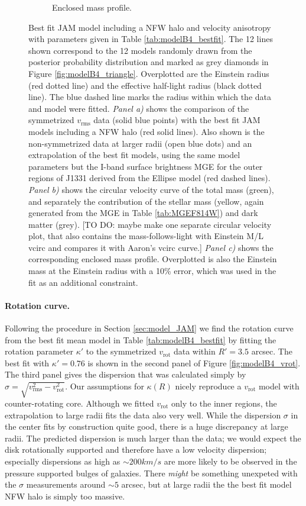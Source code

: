 \begin{figure}
\begin{subfigure}{.48\textwidth}
  \caption{Enclosed mass profile.}
  \label{fig:modelB4_enclMass}
\end{subfigure}
\caption{Best fit JAM model including a NFW halo and velocity anisotropy with parameters given in Table \ref{tab:modelB4_bestfit}. The 12 lines shown correspond to the 12 models randomly drawn from the posterior probability distribution and marked as grey diamonds in Figure \ref{fig:modelB4_triangle}. Overplotted are the Einstein radius (red dotted line) and the effective half-light radius (black dotted line). The blue dashed line marks the radius within which the data and model were fitted. \emph{Panel a)} shows the comparison of the symmetrized $v_\text{rms}$ data (solid blue points) with the best fit JAM models including a NFW halo (red solid lines). Also shown is the non-symmetrized data at larger radii (open blue dots) and an extrapolation of the best fit models, using the same model parameters but the I-band surface brightness MGE for the outer regions of J1331 derived from the Ellipse model (red dashed lines). \emph{Panel b)} shows the circular velocity curve of the total mass (green), and separately the contribution of the stellar mass (yellow, again generated from the MGE in Table \ref{tab:MGEF814W}) and dark matter (grey). [TO DO: maybe make one separate circular velocity plot, that also contains the mass-follows-light with Einstein M/L vcirc and compares it with Aaron's vcirc curve.] \emph{Panel c)} shows the corresponding enclosed mass profile. Overplotted is also the Einstein mass at the Einstein radius with a 10\% error, which was used in the fit as an additional constraint.}
\label{fig:modelB4_models}
\end{figure}



\paragraph{Rotation curve.} Following the procedure in Section \ref{sec:model_JAM} we find the rotation curve from the best fit mean model in Table \ref{tab:modelB4_bestfit} by fitting the rotation parameter $\kappa'$ to the symmetrized $v_\text{rot}$ data within $R' = 3.5$ arcsec. The best fit with $\kappa' = 0.76$ is shown in the second panel of Figure \ref{fig:modelB4_vrot}. The third panel gives the dispersion that was calculated simply by $\sigma = \sqrt{v_\text{rms}^2 - v_\text{rot}^2}$. Our assumptions for $\kappa(R)$ nicely reproduce a $v_\text{rot}$ model with counter-rotating core. Although we fitted $v_\text{rot}$ only to the inner regions, the extrapolation to large radii fits the data also very well. While the dispersion $\sigma$ in the center fits by construction quite good, there is a huge discrepancy at large radii. The predicted dispersion is much larger than the data; we would expect the disk rotationally supported and therefore have a low velocity dispersion; especially dispersions as high as $\sim 200 km/s$ are more likely to be observed in the pressure supported bulges of galaxies. There \emph{might} be something unexpeted with the $\sigma$ measurements around $\sim 5$ arcsec, but at large radii the the best fit model NFW halo is simply too massive. 

